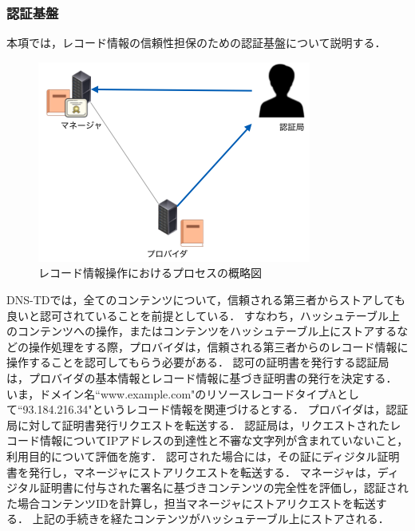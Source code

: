 \subsubsection{認証基盤}
\label{sec:certificate}
本項では，レコード情報の信頼性担保のための認証基盤について説明する．
\begin{figure}[h]
 \centering
 \includegraphics[scale=0.7]{figure/certificate-procedure.png}
 \caption{レコード情報操作におけるプロセスの概略図}
 \label{fig:manager-provider}
\end{figure}

DNS-TDでは，全てのコンテンツについて，信頼される第三者からストアしても良いと認可されていることを前提としている．
すなわち，ハッシュテーブル上のコンテンツへの操作，またはコンテンツをハッシュテーブル上にストアするなどの操作処理をする際，プロバイダは，信頼される第三者からのレコード情報に操作することを認可してもらう必要がある．
認可の証明書を発行する認証局は，プロバイダの基本情報とレコード情報に基づき証明書の発行を決定する．
いま，ドメイン名``www.example.com"のリソースレコードタイプAとして``93.184.216.34"というレコード情報を関連づけるとする．
プロバイダは，認証局に対して証明書発行リクエストを転送する．
認証局は，リクエストされたレコード情報についてIPアドレスの到達性と不審な文字列が含まれていないこと，利用目的について評価を施す．
認可された場合には，その証にディジタル証明書を発行し，マネージャにストアリクエストを転送する．
マネージャは，ディジタル証明書に付与された署名に基づきコンテンツの完全性を評価し，認証された場合コンテンツIDを計算し，担当マネージャにストアリクエストを転送する．
上記の手続きを経たコンテンツがハッシュテーブル上にストアされる．



